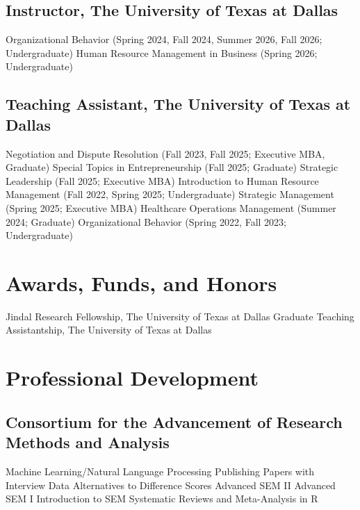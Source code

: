 \subsection*{Instructor, The University of Texas at Dallas}

\begin{entries}
\entn{}Organizational Behavior (Spring 2024, Fall 2024, Summer 2026, Fall 2026; Undergraduate)
\entn{}Human Resource Management in Business (Spring 2026; Undergraduate)
\end{entries}

\subsection*{Teaching Assistant, The University of Texas at Dallas}

\begin{entries}
\entn{}Negotiation and Dispute Resolution (Fall 2023, Fall 2025; Executive MBA, Graduate)
\entn{}Special Topics in Entrepreneurship (Fall 2025; Graduate)
\entn{}Strategic Leadership (Fall 2025; Executive MBA)
\entn{}Introduction to Human Resource Management (Fall 2022, Spring 2025; Undergraduate)
\entn{}Strategic Management (Spring 2025; Executive MBA)
\entn{}Healthcare Operations Management (Summer 2024; Graduate)
\entn{}Organizational Behavior (Spring 2022, Fall 2023; Undergraduate)
\end{entries}
\fi


\section*{Awards, Funds, and Honors}

\begin{entries}
    Jindal Research Fellowship, The University of Texas at Dallas
    Graduate Teaching Assistantship, The University of Texas at Dallas
\end{entries}


\ifcvextended
\section*{Professional Development}

\subsection*{Consortium for the Advancement of Research Methods and Analysis}

\begin{entries}
    Machine Learning/Natural Language Processing
    Publishing Papers with Interview Data
    Alternatives to Difference Scores
    Advanced SEM II
    Advanced SEM I
    Introduction to SEM
    Systematic Reviews and Meta-Analysis in R
\end{entries}

